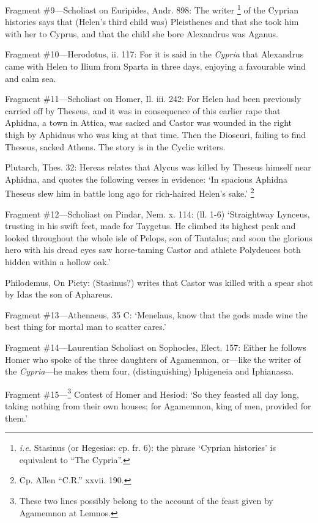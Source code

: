Fragment \#9—Scholiast on Euripides, Andr. 898: The writer \footnote{\emph{i.e.} Stasinus (or
Hegesias: cp. fr. 6): the phrase ‘Cyprian histories’ is equivalent
to “The Cypria”.} of the Cyprian histories says
that (Helen’s third child was) Pleisthenes and that she took him with her
to Cyprus, and that the child she bore Alexandrus was Aganus.

Fragment \#10—Herodotus, ii. 117: For it is said in the
\emph{Cypria} that Alexandrus came with Helen to Ilium from Sparta in
three days, enjoying a favourable wind and calm sea.

Fragment \#11—Scholiast on Homer, Il. iii. 242: For Helen had been
previously carried off by Theseus, and it was in consequence of this earlier
rape that Aphidna, a town in Attica, was sacked and Castor was wounded in the
right thigh by Aphidnus who was king at that time. Then the Dioscuri, failing
to find Theseus, sacked Athens. The story is in the Cyclic writers.

Plutarch, Thes. 32: Hereas relates that Alycus was killed by Theseus himself
near Aphidna, and quotes the following verses in evidence: ‘In spacious
Aphidna Theseus slew him in battle long ago for rich-haired Helen’s
sake.’ \footnote{Cp. Allen
“C.R.” xxvii. 190.}

Fragment \#12—Scholiast on Pindar, Nem. x. 114: (ll. 1-6)
‘Straightway Lynceus, trusting in his swift feet, made for Taygetus. He
climbed its highest peak and looked throughout the whole isle of Pelops, son of
Tantalus; and soon the glorious hero with his dread eyes saw horse-taming
Castor and athlete Polydeuces both hidden within a hollow oak.’

Philodemus, On Piety: (Stasinus?) writes that Castor was killed with a spear
shot by Idas the son of Aphareus.

Fragment \#13—Athenaeus, 35 C: ‘Menelaus, know that the gods made
wine the best thing for mortal man to scatter cares.’

Fragment \#14—Laurentian Scholiast on Sophocles, Elect. 157: Either he
follows Homer who spoke of the three daughters of Agamemnon, or—like the
writer of the \emph{Cypria}—he makes them four, (distinguishing)
Iphigeneia and Iphianassa.

Fragment \#15—\footnote{These two lines possibly
belong to the account of the feast given by Agamemnon at Lemnos.} Contest of Homer and Hesiod:
‘So they feasted all day long, taking nothing from their own houses; for
Agamemnon, king of men, provided for them.’

